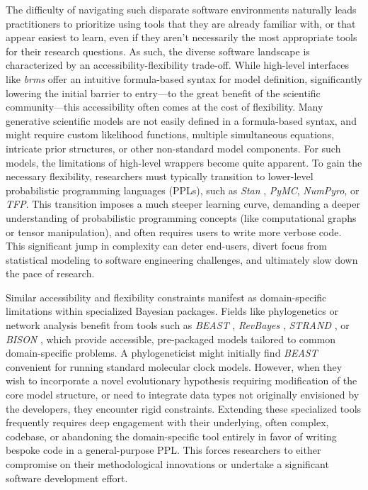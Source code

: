 \documentclass[blind,lineno,num-refs]{wiley-article}
\begin{document}
The difficulty of navigating such disparate software environments naturally leads practitioners to prioritize using tools that they are already familiar with, or that appear easiest to learn, even if they aren't necessarily the most appropriate tools for their research questions. As such, the diverse software landscape is characterized by an accessibility-flexibility trade-off. While high-level interfaces like \textit{brms} offer an intuitive formula-based syntax for model definition, significantly lowering the initial barrier to entry---to the great benefit of the scientific community---this accessibility often comes at the cost of flexibility. Many generative scientific models are not easily defined in a formula-based syntax, and might require custom likelihood functions, multiple simultaneous equations, intricate prior structures, or other non-standard model components. For such models, the limitations of high-level wrappers become quite apparent. To gain the necessary flexibility, researchers must typically transition to lower-level probabilistic programming languages (PPLs), such as \textit{Stan} \citep{Stan}, \textit{PyMC}, \textit{NumPyro}, or \textit{TFP}. This transition imposes a much steeper learning curve, demanding a deeper understanding of probabilistic programming concepts (like computational graphs or tensor manipulation), and often requires users to write more verbose code. This significant jump in complexity can deter end-users, divert focus from statistical modeling to software engineering challenges, and ultimately slow down the pace of research.

Similar accessibility and flexibility constraints manifest as domain-specific limitations within specialized Bayesian packages. Fields like phylogenetics or network analysis benefit from tools such as \textit{BEAST} \citep{BEAST}, \textit{RevBayes} \citep{RevBayes}, \textit{STRAND} \citep{STRAND1}, or \textit{BISON} \citep{BISON}, which provide accessible, pre-packaged models tailored to common domain-specific problems. A phylogeneticist might initially find \textit{BEAST} convenient for running standard molecular clock models. However, when they wish to incorporate a novel evolutionary hypothesis requiring modification of the core model structure, or need to integrate data types not originally envisioned by the developers, they encounter rigid constraints. Extending these specialized tools frequently requires deep engagement with their underlying, often complex, codebase, or abandoning the domain-specific tool entirely in favor of writing bespoke code in a general-purpose PPL. This forces researchers to either compromise on their methodological innovations or undertake a significant software development effort. 
\end{document}
